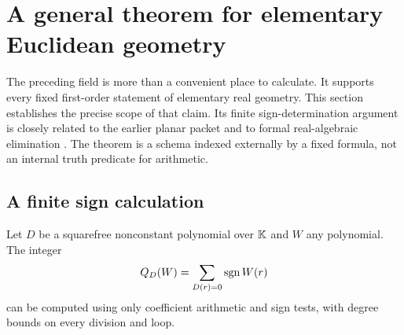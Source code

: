 \section{A general theorem for elementary Euclidean geometry}
\label{sec:elimination}
The preceding field is more than a convenient place to calculate.
It supports every fixed first-order statement of elementary real geometry.
This section establishes the precise scope of that claim. Its finite
sign-determination argument is closely related to the earlier planar
packet and to formal real-algebraic elimination \cite{planar,cm,pr}.
The theorem is a schema indexed externally by a fixed formula, not an
internal truth predicate for arithmetic.

\subsection{A finite sign calculation}
\begin{lemma}\label{qe:query}
Let $D$ be a squarefree nonconstant polynomial over $\mathbb K$ and $W$ any
polynomial. The integer
\[
 Q_D(W)=\sum_{D(r)=0}\operatorname{sgn} W(r)
\]
can be computed using only coefficient arithmetic and sign tests, with
degree bounds on every division and loop.
\end{lemma}
